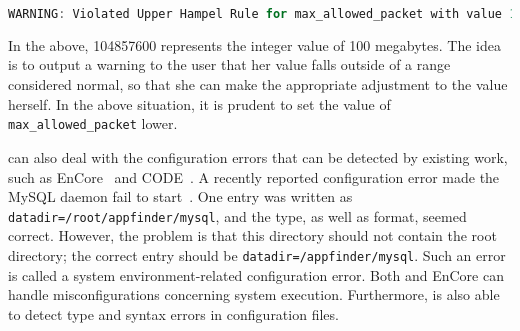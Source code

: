 \begin{lstlisting}[language=C, xleftmargin=.01\textwidth]
WARNING: Violated Upper Hampel Rule for max_allowed_packet with value 104857600 
\end{lstlisting} 

In the above, 104857600 represents the integer value of 100 megabytes. The idea is to output
a warning to the user that her value falls outside of a range considered normal, so that she
can make the appropriate adjustment to the value herself. In the above situation, it is 
prudent to set the value of {\tt max\_allowed\_packet} lower. 

\app can also deal with the configuration errors that can be detected by
existing work, such as EnCore~\cite{zhang14encore} and
CODE~\cite{yuan11context}.
A recently reported configuration error made the MySQL
daemon fail to start~\cite{syserror}.
One entry was written as 
{\tt datadir=/root/appfinder/mysql}, and the type, as well as 
format, seemed correct.
However, the problem is that this directory should not 
contain the root directory; the correct entry
should be {\tt datadir=/appfinder/mysql}.
Such an error is called a system environment-related configuration error.
Both \app and EnCore can handle misconfigurations concerning system execution.
Furthermore, \app is also able to detect type and syntax errors
in configuration files.
